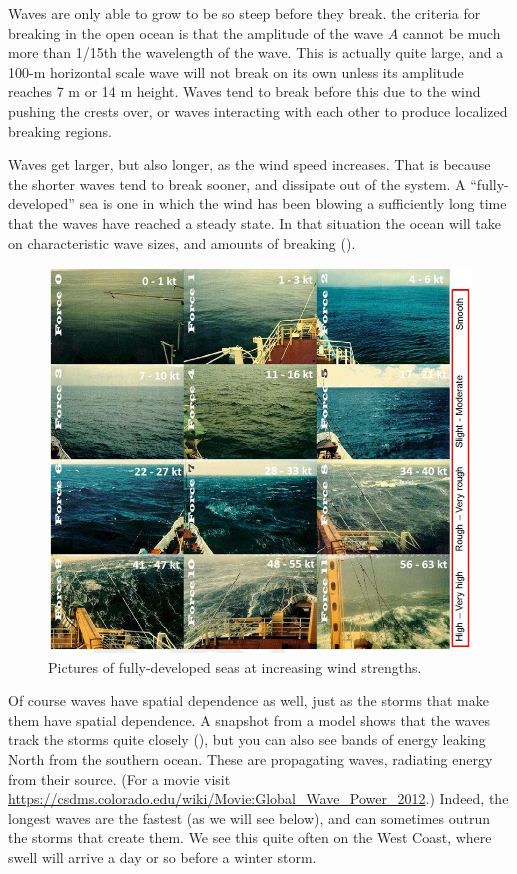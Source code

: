 Waves are only able to grow to be so steep before they break.  the criteria for breaking in the open ocean is that the amplitude of the wave $A$ cannot be much more than 1/15th the wavelength of the wave.  This is actually quite large, and a 100-m horizontal scale wave will not break on its own unless its amplitude reaches 7 m or 14 m height.  Waves tend to break before this due to the wind pushing the crests over, or waves interacting with each other to produce localized breaking regions.  

Waves get larger, but also longer, as the wind speed increases.  That is because the shorter waves tend to break sooner, and dissipate out of the system.  A ``fully-developed'' sea is one in which the wind has been blowing a sufficiently long time that the waves have reached a steady state.  In that situation the ocean will take on characteristic wave sizes, and amounts of breaking ().  

\begin{figure}[hbt]
  \begin{center}
    \includegraphics{figs/Waves/SeaStatePics}
    \caption{Pictures of fully-developed seas at increasing wind strengths.  }
    \label{fig:SeaStatePics}  
  \end{center}
\end{figure}

Of course waves have spatial dependence as well, just as the storms that make them have spatial dependence.  A snapshot from a model shows that the waves track the storms quite closely (), but you can also see bands of energy leaking North from  the southern ocean.  These are propagating waves, radiating energy from their source. (For a movie visit \url{https://csdms.colorado.edu/wiki/Movie:Global_Wave_Power_2012}.)  Indeed, the longest waves are the fastest (as we will see below), and can sometimes outrun the storms that create them.  We see this quite often on the West Coast, where swell will arrive a day or so before a winter storm.  


